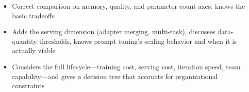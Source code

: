 \begin{interviewq}

\goodgreat
\begin{itemize}
    \item {} Correct comparison on memory, quality, and parameter-count axes; knows the basic tradeoffs
    \item {} Adds the serving dimension (adapter merging, multi-task), discusses data-quantity thresholds, knows prompt tuning's scaling behavior and when it is actually viable
    \item {} Considers the full lifecycle---training cost, serving cost, iteration speed, team capability---and gives a decision tree that accounts for organizational constraints
\end{itemize}

\end{interviewq}

